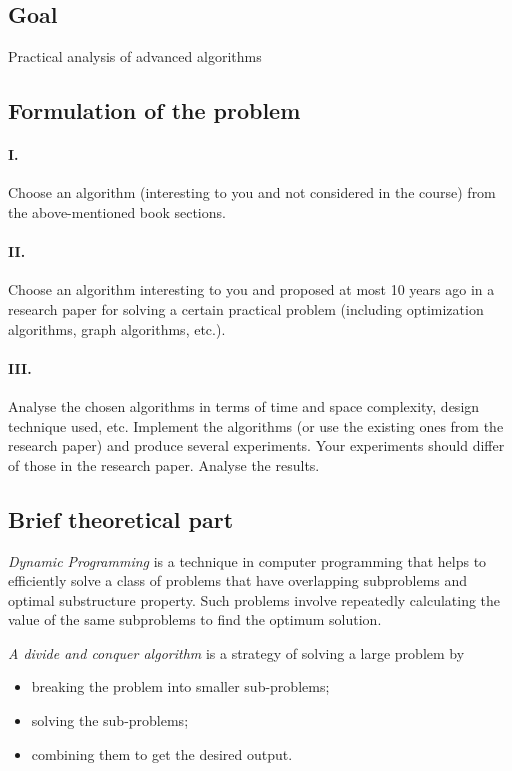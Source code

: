 \newpage
\subsection{Goal}\label{subsec:goal}

Practical analysis of advanced algorithms

\subsection{Formulation of the problem}\label{subsec:formulation-of-the-problem}

\paragraph{I.}
Choose an algorithm (interesting to you and not considered in the course) from the above-mentioned book sections.

\paragraph{II.}
Choose an algorithm interesting to you and proposed at most 10 years ago in a research paper for solving a certain practical problem (including optimization algorithms, graph algorithms, etc.).

\paragraph{III.}
Analyse the chosen algorithms in terms of time and space complexity, design technique used, etc.
Implement the algorithms (or use the existing ones from the
research paper) and produce several experiments.
Your experiments should differ of those in the research paper.
Analyse the results.

\subsection{Brief theoretical part}\label{subsec:brief-theoretical-part}

\textit{Dynamic Programming} is a technique in computer programming that helps to efficiently solve a class of problems that have overlapping subproblems and optimal substructure property.
Such problems involve repeatedly calculating the value of the same subproblems to find the optimum solution.

\textit{A divide and conquer algorithm} is a strategy of solving a large problem by
\begin{itemize}
    \item breaking the problem into smaller sub-problems;
    \item solving the sub-problems;
    \item combining them to get the desired output.
\end{itemize}

